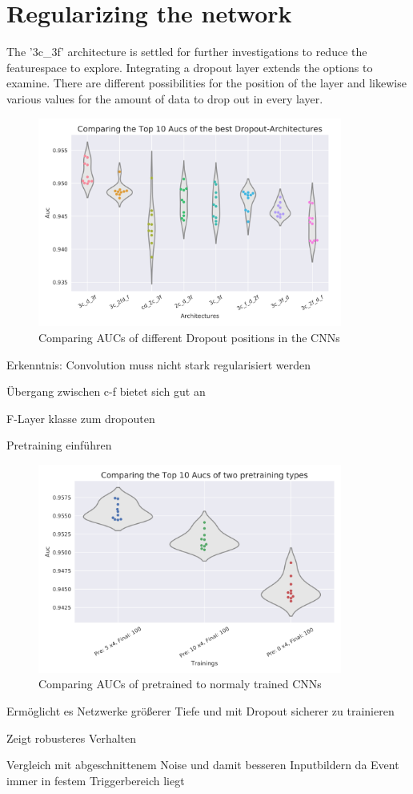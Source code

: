 \section{Regularizing the network}
The '3c\_3f' architecture is settled for further investigations to reduce the featurespace to explore.
Integrating a dropout layer extends the options to examine.
There are different possibilities for the position of the layer and
likewise various values for the amount of data to drop out in every layer.

\begin{figure}
    \centering
    \includegraphics[width=10cm]{Plots/Randomized_Dropout_Model_Comparison.png}
    \caption{Comparing AUCs of different Dropout positions in the CNNs}
    \label{fig:random_dropout}
\end{figure}

Erkenntnis: Convolution muss nicht stark regularisiert werden

Übergang zwischen c-f bietet sich gut an

F-Layer klasse zum dropouten

Pretraining einführen

\begin{figure}
    \centering
    \includegraphics[width=10cm]{Plots/Randomized_Pretraining_Model_Comparison.png}
    \caption{Comparing AUCs of pretrained to normaly trained CNNs}
    \label{fig:random_pretraining}
\end{figure}

Ermöglicht es Netzwerke größerer Tiefe und mit Dropout sicherer zu trainieren

Zeigt robusteres Verhalten

Vergleich mit abgeschnittenem Noise und damit besseren Inputbildern da Event immer in festem Triggerbereich liegt
